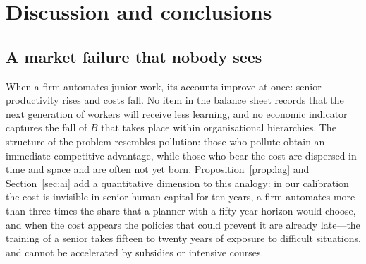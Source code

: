 \documentclass[preprint,12pt,authoryear]{elsarticle}
\begin{document}
\section{Discussion and conclusions}\label{sec:conclusions}

\subsection{A market failure that nobody sees}

When a firm automates junior work, its accounts improve at once: senior productivity rises and costs fall. No item in the balance sheet records that the next generation of workers will receive less learning, and no economic indicator captures the fall of $B$ that takes place within organisational hierarchies. The structure of the problem resembles pollution: those who pollute obtain an immediate competitive advantage, while those who bear the cost are dispersed in time and space and are often not yet born. Proposition~\ref{prop:lag} and Section~\ref{sec:ai} add a quantitative dimension to this analogy: in our calibration the cost is invisible in senior human capital for ten years, a firm automates more than three times the share that a planner with a fifty-year horizon would choose, and when the cost appears the policies that could prevent it are already late---the training of a senior takes fifteen to twenty years of exposure to difficult situations, and cannot be accelerated by subsidies or intensive courses.
\end{document}
